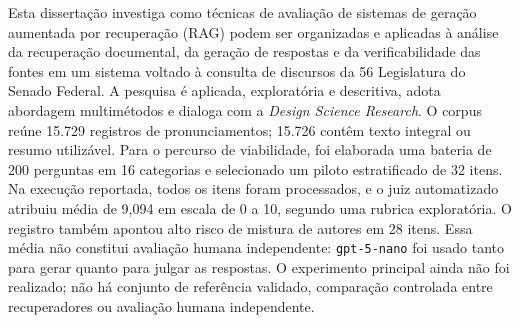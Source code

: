 \begin{resumo}
Esta dissertação investiga como técnicas de avaliação de sistemas de geração aumentada por recuperação (RAG) podem ser organizadas e aplicadas à análise da recuperação documental, da geração de respostas e da verificabilidade das fontes em um sistema voltado à consulta de discursos da 56\textordfeminine{} Legislatura do Senado Federal. A pesquisa é aplicada, exploratória e descritiva, adota abordagem multimétodos e dialoga com a \textit{Design Science Research}. O corpus reúne 15.729 registros de pronunciamentos; 15.726 contêm texto integral ou resumo utilizável. Para o percurso de viabilidade, foi elaborada uma bateria de 200 perguntas em 16 categorias e selecionado um piloto estratificado de 32 itens. Na execução reportada, todos os itens foram processados, e o juiz automatizado atribuiu média de 9,094 em escala de 0 a 10, segundo uma rubrica exploratória. O registro também apontou alto risco de mistura de autores em 28 itens. Essa média não constitui avaliação humana independente: \texttt{gpt-5-nano} foi usado tanto para gerar quanto para julgar as respostas. O experimento principal ainda não foi realizado; não há conjunto de referência validado, comparação controlada entre recuperadores ou avaliação humana independente.
\end{resumo}
